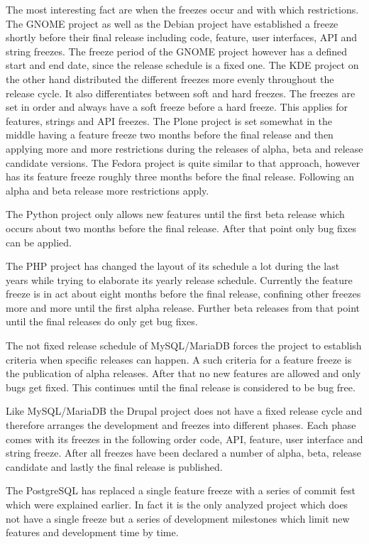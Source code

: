 The most interesting fact are when the freezes occur and with which
restrictions. The GNOME project as well as the Debian project have established
a freeze shortly before their final release including code, feature, user
interfaces, \ac{API} and string freezes. The freeze period of the GNOME project
however has a defined start and end date, since the release schedule is a fixed
one. The KDE project on the other hand distributed the different freezes more
evenly throughout the release cycle. It also differentiates between soft and
hard freezes. The freezes are set in order and always have a soft freeze before
a hard freeze. This applies for features, strings and \ac{API} freezes. The
Plone project is set somewhat in the middle having a feature freeze two months
before the final release and then applying more and more restrictions during
the releases of alpha, beta and release candidate versions. The Fedora project
is quite similar to that approach, however has its feature freeze roughly three
months before the final release. Following an alpha and beta release more
restrictions apply.

The Python project only allows new features until the first beta release which
occurs about two months before the final release. After that point only bug
fixes can be applied.

The PHP project has changed the layout of its schedule a lot during the last
years while trying to elaborate its yearly release schedule. Currently the
feature freeze is in act about eight months before the final release, confining
other freezes more and more until the first alpha release. Further beta
releases from that point until the final releases do only get bug fixes.

The not fixed release schedule of MySQL/MariaDB forces the project to establish
criteria when specific releases can happen. A such criteria for a feature
freeze is the publication of alpha releases. After that no new features are
allowed and only bugs get fixed. This continues until the final release
is considered to be bug free.

Like MySQL/MariaDB the Drupal project does not have a fixed release cycle and
therefore arranges the development and freezes into different phases. Each
phase comes with its freezes in the following order code, \ac{API}, feature,
user interface and string freeze. After all freezes have been declared a number
of alpha, beta, release candidate and lastly the final release is published.

The PostgreSQL has replaced a single feature freeze with a series of commit
fest which were explained earlier. In fact it is the only analyzed project
which does not have a single freeze but a series of development milestones
which limit new features and development time by time.

